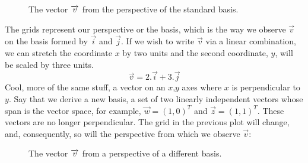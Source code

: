 \documentclass[600paper, 11pt,twoside,openany]{kdp}
\begin{document}
\begin{figure}[h!]
\begin{center}
\end{center}
\vspace*{3pt}
\caption{The vector $\protect\overrightarrow{v}$ from the perspective of the standard basis.}
\end{figure}

\indent The grids represent our perspective or the basis, which is the way we observe $\overrightarrow{v}$ on the basis formed by $\overrightarrow{i}$ and $\overrightarrow{j}$. If we wish to write $\overrightarrow{v}$ via a linear combination, we can stretch the coordinate $x$ by two units and the second coordinate, $y$, will be scaled by three units.
\[ \overrightarrow{v} = 2.\overrightarrow{i} + 3.\overrightarrow{j} \]
\indent Cool, more of the same stuff, a vector on an $x$,$y$ axes where $x$ is perpendicular to $y$. Say that we derive a new basis, a set of two linearly independent vectors whose span is the vector space, for example, $\overrightarrow{w} = (1,0)^T$ and $\overrightarrow{z} = (1,1)^T$. These vectors are no longer perpendicular. The grid in the previous plot will change, and, consequently, so will the perspective from which we observe $\overrightarrow{v}$:

\begin{figure}[h!]
\begin{center}
\end{center}
\vspace*{3pt}
\caption{The vector $\protect\overrightarrow{v}$ from a perspective of a different basis.}
\end{figure}
\end{document}
